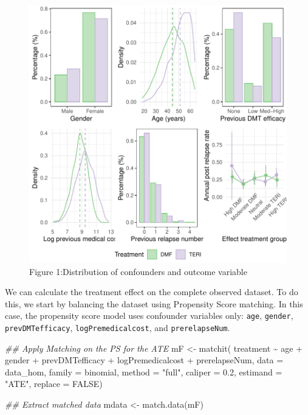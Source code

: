 \documentclass[
  letterpaper,
  DIV=11,
  numbers=noendperiod]{scrreprt}
\newenvironment{Shaded}{\begin{snugshade}}{\end{snugshade}}
\newcommand{\AttributeTok}[1]{\textcolor[rgb]{0.40,0.45,0.13}{#1}}
\newcommand{\ConstantTok}[1]{\textcolor[rgb]{0.56,0.35,0.01}{#1}}
\newcommand{\DocumentationTok}[1]{\textcolor[rgb]{0.37,0.37,0.37}{\textit{#1}}}
\newcommand{\FloatTok}[1]{\textcolor[rgb]{0.68,0.00,0.00}{#1}}
\newcommand{\FunctionTok}[1]{\textcolor[rgb]{0.28,0.35,0.67}{#1}}
\newcommand{\NormalTok}[1]{\textcolor[rgb]{0.00,0.23,0.31}{#1}}
\newcommand{\OtherTok}[1]{\textcolor[rgb]{0.00,0.23,0.31}{#1}}
\newcommand{\SpecialCharTok}[1]{\textcolor[rgb]{0.37,0.37,0.37}{#1}}
\newcommand{\StringTok}[1]{\textcolor[rgb]{0.13,0.47,0.30}{#1}}
\begin{document}
\begin{figure}

{\centering \includegraphics{chapter_09_files/figure-pdf/hom plotdata-1.pdf}

}

\caption{Figure 1:Distribution of confounders and outcome variable}

\end{figure}

We can calculate the treatment effect on the complete observed dataset.
To do this, we start by balancing the dataset using Propensity Score
matching. In this case, the propensity score model uses confounder
variables only: \texttt{age}, \texttt{gender}, \texttt{prevDMTefficacy},
\texttt{logPremedicalcost}, and \texttt{prerelapseNum}.

\begin{Shaded}
\begin{Highlighting}[]
\DocumentationTok{\#\# Apply Matching on the PS for the ATE}
\NormalTok{mF }\OtherTok{\textless{}{-}} \FunctionTok{matchit}\NormalTok{(  treatment }\SpecialCharTok{\textasciitilde{}}\NormalTok{ age }\SpecialCharTok{+}\NormalTok{ gender }\SpecialCharTok{+}\NormalTok{ prevDMTefficacy }\SpecialCharTok{+}\NormalTok{ logPremedicalcost }\SpecialCharTok{+}\NormalTok{ prerelapseNum, }
                \AttributeTok{data =}\NormalTok{ data\_hom,}
                \AttributeTok{family =}\NormalTok{ binomial,}
                \AttributeTok{method =} \StringTok{"full"}\NormalTok{,}
                \AttributeTok{caliper =} \FloatTok{0.2}\NormalTok{,}
                \AttributeTok{estimand =} \StringTok{"ATE"}\NormalTok{,}
                \AttributeTok{replace =} \ConstantTok{FALSE}\NormalTok{) }

\DocumentationTok{\#\# Extract matched data}
\NormalTok{mdata }\OtherTok{\textless{}{-}} \FunctionTok{match.data}\NormalTok{(mF)}
\end{Highlighting}
\end{Shaded}
\end{document}
